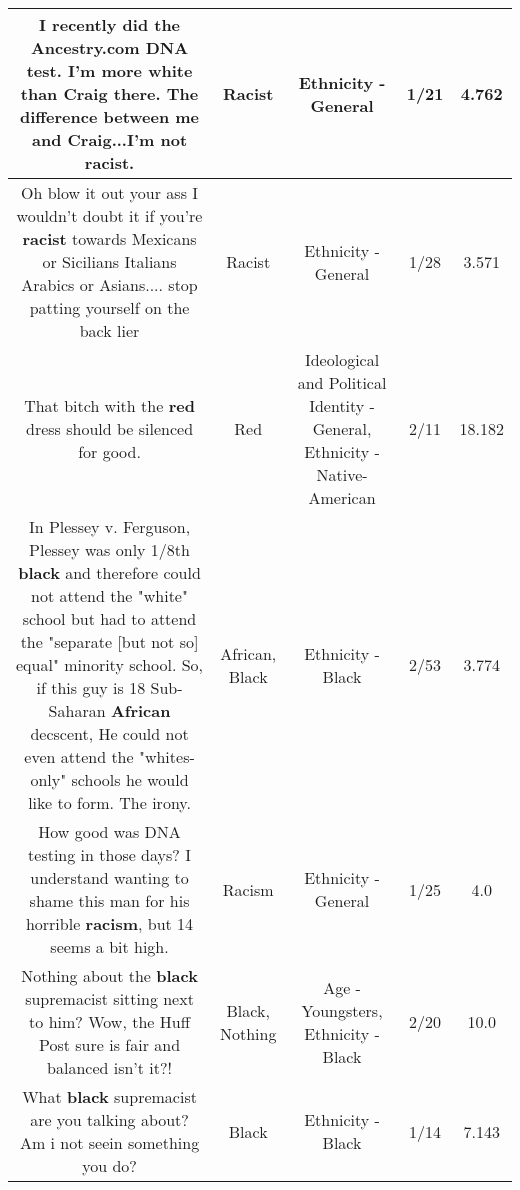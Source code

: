 \documentclass[11pt]{article}
\newlength\mylength
\begin{document}
\begin{center}
\begin{longtable}{|C{.65\mylength}|C{.30\mylength}|C{.12\mylength}|C{.12\mylength}|C{.12\mylength}|}
  \small I recently did the Ancestry.com DNA test.  I'm more white than Craig there.  The difference between me and Craig...I'm not \textbf{racist}.\normalsize   & Racist & Ethnicity - General & 1/21 & 4.762 \\  \hline
  \small Oh blow it out your ass I wouldn't doubt it if you're \textbf{racist} towards Mexicans or Sicilians Italians Arabics or Asians.... stop patting yourself on the back lier\normalsize   & Racist & Ethnicity - General & 1/28 & 3.571 \\  \hline
  \small That bitch with the  \textbf{r\textbf{ed}} dress should be silenced for good.\normalsize   & Red &  Ideological and Political Identity - General, Ethnicity - Native-American & 2/11 & 18.182 \\  \hline
  \small In Plessey v. Ferguson, Plessey was only 1/8th \textbf{black} and therefore could not attend the "white" school but had to attend the "separate [but not so] equal" minority school.  So, if this guy is 18 Sub-Saharan \textbf{African} decscent, He could not even attend the "whites-only" schools he would like to form.  The irony.\normalsize   & African, Black & Ethnicity - Black & 2/53 & 3.774 \\  \hline
  \small How good was DNA testing in those days? I understand wanting to shame this man for his horrible \textbf{racism}, but 14 seems a bit high.\normalsize   & Racism & Ethnicity - General & 1/25 & 4.0 \\  \hline
  \small Nothing about the \textbf{black} supremacist sitting next to him? Wow, the Huff Post sure is fair and balanced isn't it?!\normalsize   & Black, Nothing & Age - Youngsters, Ethnicity - Black & 2/20 & 10.0 \\  \hline
  \small What \textbf{black} supremacist are you talking about? Am i not seein something you do?\normalsize   & Black & Ethnicity - Black & 1/14 & 7.143 \\  \hline

\end{longtable}
\end{center}
\end{document}
